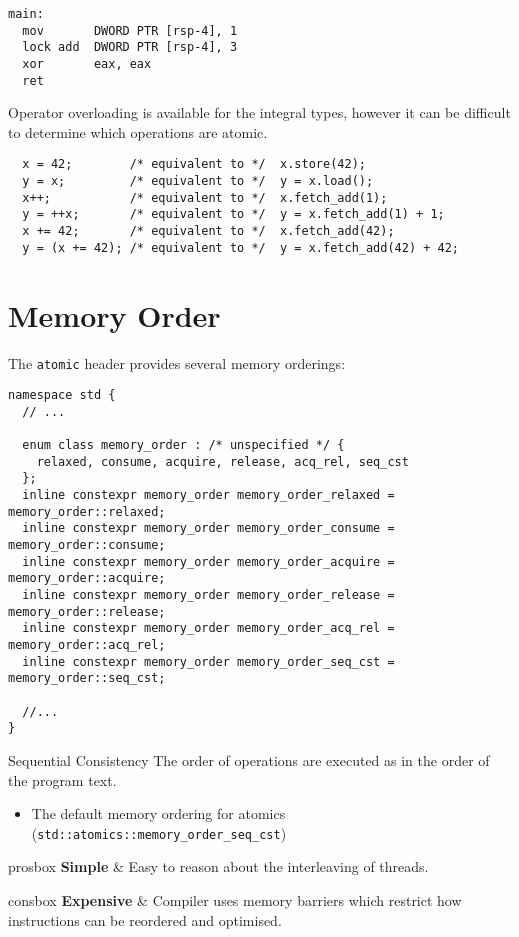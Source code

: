 \hfill
\begin{minipage}{.49\textwidth}
  \begin{verbatim}
main:
  mov       DWORD PTR [rsp-4], 1
  lock add  DWORD PTR [rsp-4], 3
  xor       eax, eax
  ret

  \end{verbatim}
\end{minipage}

Operator overloading is available for the integral types, however it can be difficult to determine which operations are atomic.
\begin{verbatim}
  x = 42;        /* equivalent to */  x.store(42);
  y = x;         /* equivalent to */  y = x.load();
  x++;           /* equivalent to */  x.fetch_add(1);
  y = ++x;       /* equivalent to */  y = x.fetch_add(1) + 1;
  x += 42;       /* equivalent to */  x.fetch_add(42);
  y = (x += 42); /* equivalent to */  y = x.fetch_add(42) + 42;
\end{verbatim}

\section{Memory Order}
The \texttt{atomic} header provides several memory orderings:
\begin{verbatim}
namespace std {
  // ...

  enum class memory_order : /* unspecified */ {
    relaxed, consume, acquire, release, acq_rel, seq_cst
  };
  inline constexpr memory_order memory_order_relaxed = memory_order::relaxed;
  inline constexpr memory_order memory_order_consume = memory_order::consume;
  inline constexpr memory_order memory_order_acquire = memory_order::acquire;
  inline constexpr memory_order memory_order_release = memory_order::release;
  inline constexpr memory_order memory_order_acq_rel = memory_order::acq_rel;
  inline constexpr memory_order memory_order_seq_cst = memory_order::seq_cst;

  //...
}
\end{verbatim}

\begin{definitionbox}{Sequential Consistency}
  The order of operations are executed as in the order of the program text.
  \begin{itemize}
    \item The default memory ordering for atomics (\texttt{std::atomics::memory_order_seq_cst})
  \end{itemize}
  \begin{tabbox}{prosbox}
    \textbf{Simple} & Easy to reason about the interleaving of threads. \\
  \end{tabbox}
  \begin{tabbox}{consbox}
    \textbf{Expensive} & Compiler uses memory barriers which restrict how instructions can be reordered and optimised. \\
  \end{tabbox}
\end{definitionbox}


